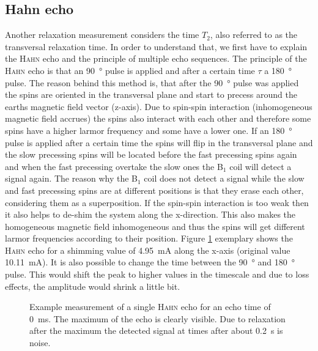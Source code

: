 \subsection{Hahn echo}
\label{sec:Hahnecho}
Another relaxation measurement considers the time $T_2$, also referred to as the transversal relaxation time.
In order to understand that, we first have to explain the \textsc{Hahn} echo and the principle of multiple echo sequences.\newline
The principle of the \textsc{Hahn} echo is that an \SI{90}{\degree} pulse is applied and after a certain time $\tau$ a \SI{180}{\degree} pulse.
The reason behind this method is, that after the \SI{90}{\degree} pulse was applied the spins are oriented in the transversal plane and start to precess around the earths magnetic field vector (z-axis).
Due to spin-spin interaction (inhomogeneous magnetic field accrues) the spins also interact with each other and therefore some spins have a higher larmor frequency and some have a lower one.
If an \SI{180}{\degree} pulse is applied after a certain time the spins will flip in the transversal plane and the slow precessing spins will be located before the fast precessing spins again and when the fast precessing  overtake the slow ones the B$_1$ coil will detect a signal again.
The reason why the B$_1$ coil does not detect a signal while the slow and fast precessing spins are at different positions is that they erase each other, considering them as a superposition.
If the spin-spin interaction is too weak then it also helps to de-shim the system along the x-direction.
This also makes the homogeneous magnetic field inhomogeneous and thus the spins will get different larmor frequencies according to their position.\newline
Figure \ref{fig:Echobeispeilsignal} exemplary shows the \textsc{Hahn} echo for a shimming value of \SI{4.95}{\milli \ampere} along the x-axis (original value \SI{10.11}{\milli \ampere}).
It is also possible to change the time between the \SI{90}{\degree} and \SI{180}{\degree} pulse.
This would shift the peak to higher values in the timescale and due to loss effects, the amplitude would shrink a little bit.
\begin{figure}[H]
    \centering
    
    \caption[Example measurement of a single \textsc{Hahn} echo for an echo time of \SI{0}{\milli \second}.]{Example measurement of a single \textsc{Hahn} echo for an echo time of \SI{0}{\milli \second}.
    The maximum of the echo is clearly visible.
    Due to relaxation after the maximum the detected signal at times after about \SI{0.2}{\second} is noise.}
    \label{fig:Echobeispeilsignal}
\end{figure}
